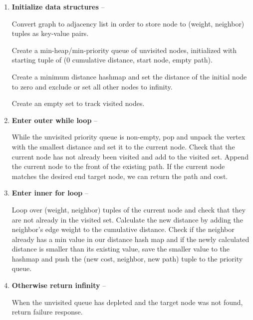 \documentclass{article}
\begin{document}
    \begin{enumerate}
        \item \textbf{Initialize data structures} -- 
        
        Convert graph to adjacency list in order to store node to (weight, neighbor) tuples as key-value pairs.
         
        Create a min-heap/min-priority queue of unvisited nodes, initialized with starting tuple of (0 cumulative distance, start node, empty path). 
        
        Create a minimum distance hashmap and set the distance of the initial node to zero and exclude or set all other nodes to infinity. 
        
        Create an empty set to track visited nodes. 
        
        \item \textbf{Enter outer while loop} -- 
        
        While the unvisited priority queue is non-empty, pop and unpack the vertex with the smallest distance and set it to the current node. Check that the current node has not already been visited and add to the visited set. Append the current node to the front of the existing path. If the current node matches the desired end target node, we can return the path and cost.
        
        \item \textbf{Enter inner for loop} -- 
        
        Loop over (weight, neighbor) tuples of the current node and check that they are not already in the visited set. Calculate the new distance by adding the neighbor's edge weight to the cumulative distance. Check if the neighbor already has a min value in our distance hash map and if the newly calculated distance is smaller than its existing value, save the smaller value to the hashmap and push the (new cost, neighbor, new path) tuple to the priority queue. 
        
        \item \textbf{Otherwise return infinity} -- 
        
        When the unvisited queue has depleted and the target node was not found, return failure response.
    \end{enumerate}
    
\end{document}
